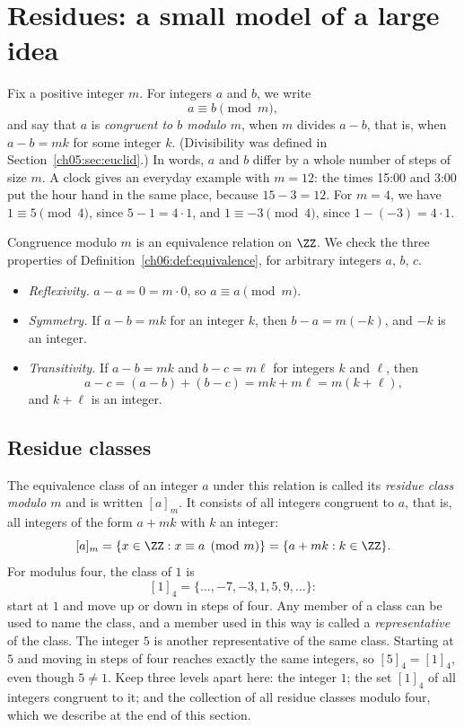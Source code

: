 \section{Residues: a small model of a large idea}\label{ch06:sec:residues}
Fix a positive integer $m$. For integers $a$ and $b$, we write
\[
a\equiv b\pmod m,
\]
and say that $a$ is \emph{congruent to $b$ modulo $m$}, when $m$ divides $a-b$, that is, when $a-b=mk$ for some integer $k$. (Divisibility was defined in Section~\ref{ch05:sec:euclid}.) In words, $a$ and $b$ differ by a whole number of steps of size $m$. A clock gives an everyday example with $m=12$: the times 15:00 and 3:00 put the hour hand in the same place, because $15-3=12$. For $m=4$, we have $1\equiv5\pmod4$, since $5-1=4\cdot1$, and $1\equiv-3\pmod4$, since $1-(-3)=4\cdot1$.

Congruence modulo $m$ is an equivalence relation on $\ZZ$. We check the three properties of Definition~\ref{ch06:def:equivalence}, for arbitrary integers $a$, $b$, $c$.
\begin{itemize}
\item \emph{Reflexivity.} $a-a=0=m\cdot0$, so $a\equiv a\pmod m$.
\item \emph{Symmetry.} If $a-b=mk$ for an integer $k$, then $b-a=m(-k)$, and $-k$ is an integer.
\item \emph{Transitivity.} If $a-b=mk$ and $b-c=m\ell$ for integers $k$ and $\ell$, then
\[
a-c=(a-b)+(b-c)=mk+m\ell=m(k+\ell),
\]
and $k+\ell$ is an integer.
\end{itemize}

\subsection*{Residue classes}
The equivalence class of an integer $a$ under this relation is called its \emph{residue class modulo $m$} and is written $[a]_m$. It consists of all integers congruent to $a$, that is, all integers of the form $a+mk$ with $k$ an integer:
\[
[a]_m=\{x\in\ZZ:x\equiv a\pmod m\}=\{a+mk:k\in\ZZ\}.
\]
For modulus four, the class of $1$ is
\[
[1]_4=\{\ldots,-7,-3,1,5,9,\ldots\}:
\]
start at $1$ and move up or down in steps of four. Any member of a class can be used to name the class, and a member used in this way is called a \emph{representative} of the class. The integer $5$ is another representative of the same class. Starting at $5$ and moving in steps of four reaches exactly the same integers, so $[5]_4=[1]_4$, even though $5\ne1$. Keep three levels apart here: the integer $1$; the set $[1]_4$ of all integers congruent to it; and the collection of all residue classes modulo four, which we describe at the end of this section.

